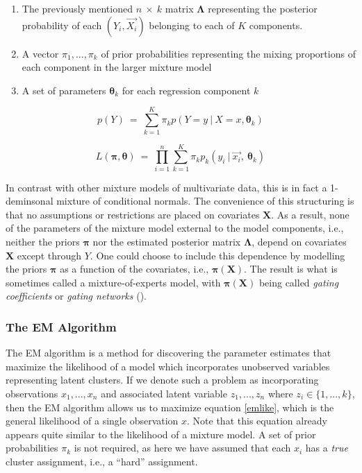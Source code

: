 \documentclass[10pt]{olplainarticle}\usepackage[]{graphicx}\usepackage[]{color}
\begin{document}
\begin{enumerate}[noitemsep]
  \item The previously mentioned $n \ \times\ k$ matrix $\boldsymbol{\Lambda}$ representing the posterior probability of each $(Y_i, \vec{X_i})$ belonging to each of $K$ components.
  \item A vector $\pi_1,...,\pi_k$ of prior probabilities representing the mixing proportions of each component in the larger mixture model
  \item A set of parameters $\boldsymbol{\theta}_k$ for each regression component $k$
\end{enumerate}

\begin{equation} \label{regmix}
  p(Y) \ =\ \sum_{k=1}^{K}\pi_k p(Y = y\ |\ X = x, \boldsymbol{\theta}_k)
\end{equation}

\begin{equation} \label{mixlike}
   L(\boldsymbol{\pi}, \boldsymbol{\theta}) \ =\ \prod_{i=1}^n \sum_{k=1}^{K} \pi_k p_k(y_i\ |\ \vec{x_i},\ \boldsymbol{\theta}_k)
\end{equation}


In contrast with other mixture models of multivariate data, this is in fact a 1-deminsonal mixture of conditional normals. The convenience of this structuring is that no assumptions or restrictions are placed on covariates $\boldsymbol{X}$. As a result, none of the parameters of the mixture model external to the model components, i.e., neither the priors $\boldsymbol{\pi}$ nor the estimated posterior matrix $\boldsymbol{\Lambda}$, depend on covariates $\boldsymbol{X}$ except through $Y$. One could choose to include this dependence by modelling the priors $\boldsymbol{\pi}$ as a function of the covariates, i.e., $\boldsymbol{\pi}(\boldsymbol{X})$. The result is what is sometimes called a mixture-of-experts model, with $\boldsymbol{\pi}(\boldsymbol{X})$ being called \emph{gating coefficients} or \emph{gating networks} (\cite{mixexperts}).




\subsubsection{The EM Algorithm}

The EM algorithm is a method for discovering the parameter estimates that maximize the likelihood of a model which incorporates unobserved variables representing latent clusters. If we denote such a problem as incorporating observations $x_1, ..., x_n$ and associated latent variable $z_1, ..., z_n$ where $z_i \in \{1,...,k\}$, then the EM algorithm allows us to maximize equation \ref{emlike}, which is the general likelihood of a single observation $x$. Note that this equation already appears quite similar to the likelihood of a mixture model. A set of prior probabilities $\pi_k$ is not required, as here we have assumed that each $x_i$ has a \emph{true} cluster assignment, i.e., a ``hard'' assignment.
\end{document}
